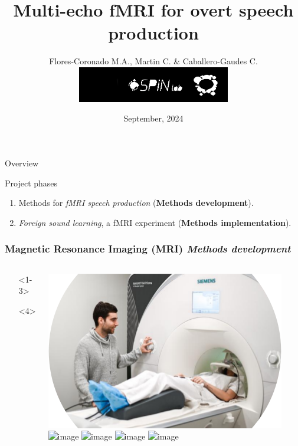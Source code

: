 \documentclass[aspectratio=169]{beamer}
\title[Multi-echo fMRI for overt speech production ]{Multi-echo fMRI for overt speech production }
\date{September, 2024 }
\author{Flores-Coronado M.A., Martin C. \& Caballero-Gaudes C. \vspace{1.4cm}
\includegraphics[width=0.5\textwidth]{images/BCBL_SPiN_copy}}
\begin{document}
\begin{frame}
\maketitle
\end{frame}



\begin{frame}{Overview}
	\begin{center}
		\begin{huge}
		Project phases
		\end{huge}
	\end{center}
	\begin{enumerate}
		\setlength\itemsep{3em}
		\item{Methods for \textit{fMRI speech production} (\textbf{Methods development}).}
		\item{\textit{Foreign sound learning}, a fMRI experiment (\textbf{Methods implementation}).}
	\end{enumerate}
\end{frame}

\begin{frame}
	\frametitle{Magnetic Resonance Imaging (MRI) \textit{Methods development} }
\begin{columns}
\begin{tiny}
	\begin{itemize}
		\item[]<1-3>{\color{red}{How does it work?}}
		\item[]<4>{\color{red}{Measument noise sources!}}
	\end{itemize}
\end{tiny}
	\includegraphics[width=.8\textwidth]{images/MRI.png} 
\includegraphics<1>[width=\textwidth]{images/spin0} 
\includegraphics<2>[width=\textwidth]{images/spin1} 
\includegraphics<3>[width=\textwidth]{images/spin2} 
\includegraphics<4>[width=\textwidth]{images/noiseSpeech} 
\end{columns}
\end{frame}
\end{document}
